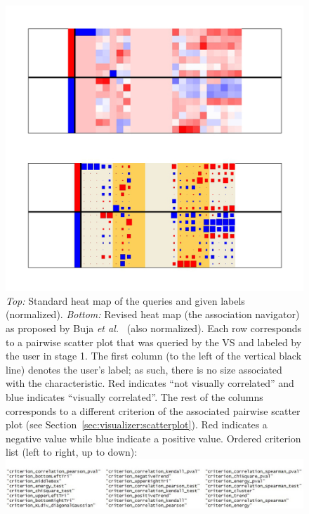 \tablespacing
\begin{figure}[H]
	\begin{center}
		\includegraphics[width=0.8\linewidth]
		{ch-usage/figures/heatmaps}
		\caption[Normalized heat maps of VS queries and user-specified labels.] 
		{\textit{Top:} Standard heat map of the queries and given labels 
		(normalized). 
		\textit{Bottom:} Revised heat map (the association navigator) as 
		proposed by Buja \textit{et al.}~\cite{buja2016} (also normalized). 
		Each row corresponds to a pairwise scatter plot that was queried by the 
		VS and labeled by the user in 
		stage 1. The first column (to the left of the vertical black line) 
		denotes the user's label; as such, there is no size associated with the 
		characteristic. Red indicates ``not visually correlated'' 
		and blue indicates ``visually correlated''. The rest of the columns 
		corresponds to a different criterion of the associated pairwise 
		scatter plot (see Section~\ref{sec:visualizer:scatterplot}). Red 
		indicates a negative value while blue indicate a positive value. 
		Ordered criterion list (left to right, up to down): 
		\includegraphics[width=1\linewidth]{ch-usage/figures/criterionlist}}
		\label{fig:usage:heatmaps}
	\end{center}
\end{figure}
\bodyspacing

